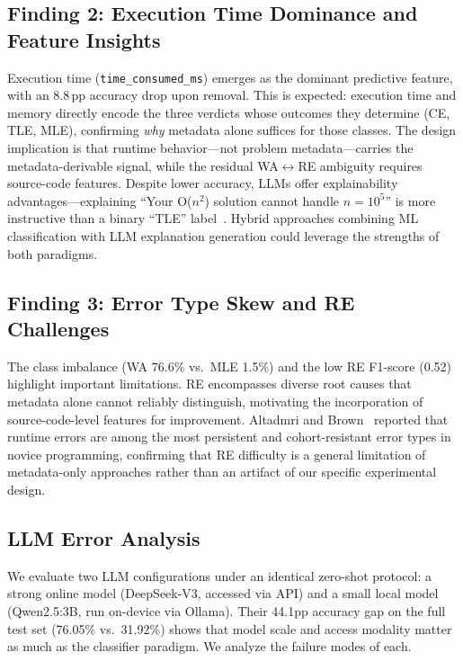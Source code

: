 \documentclass[acmsmall]{acmart}
\begin{document}
\subsection{Finding 2: Execution Time Dominance and Feature Insights}

Execution time (\texttt{time\_consumed\_ms}) emerges as the dominant
predictive feature, with an 8.8\,pp accuracy drop upon removal. This is
expected: execution time and memory directly encode the three
verdicts whose outcomes they determine (CE, TLE, MLE), confirming \emph{why}
metadata alone suffices for those classes. The design implication is that
runtime behavior---not problem metadata---carries the metadata-derivable
signal, while the residual WA$\leftrightarrow$RE ambiguity requires
source-code features. Despite lower accuracy, LLMs offer explainability
advantages---explaining ``Your O($n^2$) solution cannot handle $n = 10^5$'' is
more instructive than a binary ``TLE'' label~\cite{finnie2022robots}. Hybrid
approaches combining ML classification with LLM explanation generation could
leverage the strengths of both paradigms.

\subsection{Finding 3: Error Type Skew and RE Challenges}

The class imbalance (WA 76.6\% vs.\ MLE 1.5\%) and the low RE F1-score (0.52)
highlight important limitations. RE encompasses diverse root causes that
metadata alone cannot reliably distinguish, motivating the incorporation of
source-code-level features for improvement. Altadmri and Brown~\cite{altadmri2015most} reported that runtime errors are
among the most persistent and cohort-resistant error types in novice
programming, confirming that RE difficulty is a general limitation of
metadata-only approaches rather than an artifact of our specific
experimental design.

\subsection{LLM Error Analysis}

We evaluate two LLM configurations under an identical zero-shot protocol: a
strong online model (DeepSeek-V3, accessed via API) and a small local model
(Qwen2.5:3B, run on-device via Ollama). Their 44.1pp accuracy gap on the
full test set (76.05\% vs.\ 31.92\%) shows that model scale and access
modality matter as much as the classifier paradigm. We analyze the failure
modes of each.
\end{document}
